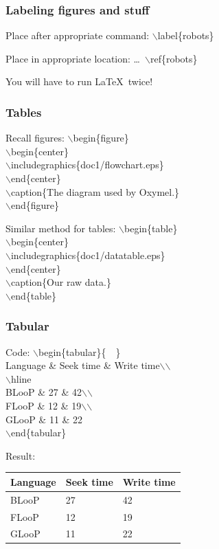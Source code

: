 \documentclass[ignorenonframetext]{beamer}
\begin{document}
\begin{frame}
  \frametitle{Labeling figures and stuff}
  \begin{block}{Place after appropriate command:}
    $\backslash$label\{robots\}
  \end{block}
  \begin{block}{Place in appropriate location:}
    \ldots\ $\backslash$ref\{robots\}
  \end{block}
  You will have to run \LaTeX\ twice!
\end{frame}

\begin{frame}
  \frametitle{Tables}
  \begin{block}{Recall figures:}
    $\backslash$begin\{figure\}\\
    \quad$\backslash$begin\{center\}\\
    \qquad$\backslash$includegraphics\{doc1/flowchart.eps\}\\
    \quad$\backslash$end\{center\}\\
    \quad$\backslash$caption\{The diagram used by Oxymel.\}\\
    $\backslash$end\{figure\}
  \end{block}
  \begin{block}{Similar method for tables:}
    $\backslash$begin\{table\}\\
    \quad$\backslash$begin\{center\}\\
    \qquad$\backslash$includegraphics\{doc1/datatable.eps\}\\
    \quad$\backslash$end\{center\}\\
    \quad$\backslash$caption\{Our raw data.\}\\
    $\backslash$end\{table\}
  \end{block}
\end{frame}

\begin{frame}
  \frametitle{Tabular}
  \begin{block}{Code:}
    $\backslash$begin\{tabular\}\{\ell\ \ell\ \ell\}\\
      \quad Language \& Seek time \& Write time$\backslash$$\backslash$\\
      \quad$\backslash$hline\\
      \quad BLooP \& 27 \& 42$\backslash$$\backslash$\\
      \quad FLooP \& 12 \& 19$\backslash$$\backslash$\\
      \quad GLooP \& 11 \& 22\\
    $\backslash$end\{tabular\}
  \end{block}
  \begin{block}{Result:}
    \begin{tabular}{l l l}
      Language & Seek time & Write time\\
      \hline
      BLooP & 27 & 42\\
      FLooP & 12 & 19\\
      GLooP & 11 & 22
    \end{tabular}
  \end{block}
\end{frame}
\end{document}
